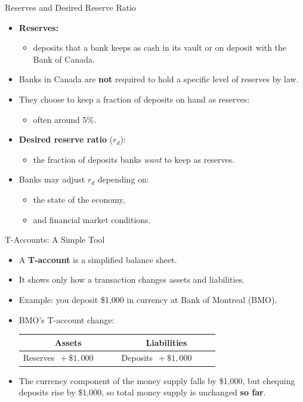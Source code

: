 \documentclass[aspectratio=169]{beamer}
\begin{document}
\begin{frame}{Reserves and Desired Reserve Ratio}
\transfade
\begin{itemize}[<+->]
  \item \textbf{Reserves:}
  \begin{itemize}[<+->]
    \item deposits that a bank keeps as cash in its vault or on deposit with the Bank of Canada.
  \end{itemize}
  \item Banks in Canada are \textbf{not} required to hold a specific level of reserves by law.
  \item They choose to keep a fraction of deposits on hand as reserves:
  \begin{itemize}[<+->]
    \item often around 5\%.
  \end{itemize}
  \item \textbf{Desired reserve ratio} (\(r_{d}\)):
  \begin{itemize}[<+->]
    \item the fraction of deposits banks \emph{want} to keep as reserves.
  \end{itemize}
  \item Banks may adjust \(r_{d}\) depending on:
  \begin{itemize}[<+->]
    \item the state of the economy,
    \item and financial market conditions.
  \end{itemize}
\end{itemize}
\end{frame}

\begin{frame}{T-Accounts: A Simple Tool}
\transfade
\begin{itemize}[<+->]
  \item A \textbf{T-account} is a simplified balance sheet.
  \item It shows only how a transaction \alert{changes} assets and liabilities.
  \item Example: you deposit \$1{,}000 in currency at Bank of Montreal (BMO).
  \item BMO's T-account change:
  \begin{center}
    \begin{tabular}{p{0.4\linewidth} p{0.4\linewidth}}
    \toprule
    \multicolumn{1}{c}{\textbf{Assets}} & \multicolumn{1}{c}{\textbf{Liabilities}} \\
    \midrule
    Reserves \(\,+ \$1{,}000\) & Deposits \(\,+ \$1{,}000\) \\
    \bottomrule
    \end{tabular}
  \end{center}
  \item The currency component of the money supply falls by \$1{,}000, but chequing deposits rise by \$1{,}000, so total money supply is unchanged \textbf{so far}.
\end{itemize}
\end{frame}
\end{document}

